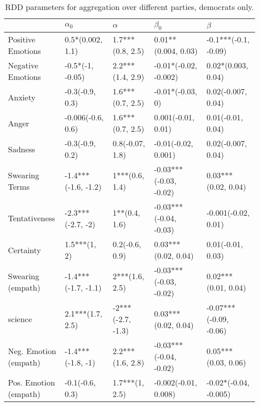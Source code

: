 \begin{table}[h]\centering
\caption{RDD parameters for aggregation over different parties, democrats only.}
	\label{fig: Party_1}
\begin{adjustbox}{width=\linewidth, center}
	\begin{tabular}{lllll}
	\toprule
	{} &           $\alpha_0$ &           $\alpha$ &               $\beta_0$ &                 $\beta$ \\
	\midrule
	Positive Emotions     &     0.5*(0.002, 1.1) &   1.7***(0.8, 2.5) &     0.01**(0.004, 0.03) &    -0.1***(-0.1, -0.09) \\
	Negative Emotions     &     -0.5*(-1, -0.05) &   2.2***(1.4, 2.9) &   -0.01*(-0.02, -0.002) &      0.02*(0.003, 0.04) \\
	Anxiety               &      -0.3(-0.9, 0.3) &   1.6***(0.7, 2.5) &        -0.01*(-0.03, 0) &      0.02(-0.007, 0.04) \\
	Anger                 &    -0.006(-0.6, 0.6) &   1.6***(0.7, 2.5) &      0.001(-0.01, 0.01) &       0.01(-0.01, 0.04) \\
	Sadness               &      -0.3(-0.9, 0.2) &    0.8(-0.07, 1.8) &     -0.01(-0.02, 0.001) &      0.02(-0.007, 0.04) \\
	Swearing Terms        &  -1.4***(-1.6, -1.2) &     1***(0.6, 1.4) &  -0.03***(-0.03, -0.02) &     0.03***(0.02, 0.04) \\
	Tentativeness         &    -2.3***(-2.7, -2) &      1**(0.4, 1.6) &  -0.03***(-0.04, -0.03) &     -0.001(-0.02, 0.01) \\
	Certainty             &         1.5***(1, 2) &     0.2(-0.6, 0.9) &     0.03***(0.02, 0.04) &       0.01(-0.01, 0.03) \\
	Swearing (empath)     &  -1.4***(-1.7, -1.1) &     2***(1.6, 2.5) &  -0.03***(-0.03, -0.02) &     0.02***(0.01, 0.04) \\
	science               &     2.1***(1.7, 2.5) &  -2***(-2.7, -1.3) &     0.03***(0.02, 0.04) &  -0.07***(-0.09, -0.06) \\
	Neg. Emotion (empath) &    -1.4***(-1.8, -1) &   2.2***(1.6, 2.8) &  -0.03***(-0.04, -0.02) &     0.05***(0.03, 0.06) \\
	Pos. Emotion (empath) &      -0.1(-0.6, 0.3) &     1.7***(1, 2.5) &    -0.002(-0.01, 0.008) &   -0.02*(-0.04, -0.005) \\
	\bottomrule
	\end{tabular}
	
\end{adjustbox}
	\end{table}

